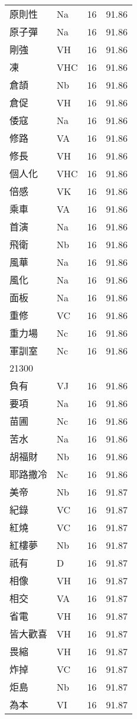 \documentclass[twocolumn]{book}
\begin{document}
\begin{supertabular}{llrr}
原則性 & Na & 16 &  91.86\\
原子彈 & Na & 16 &  91.86\\
剛強 & VH & 16 &  91.86\\
凍 & VHC & 16 &  91.86\\
倉頡 & Nb & 16 &  91.86\\
倉促 & VH & 16 &  91.86\\
倭寇 & Na & 16 &  91.86\\
修路 & VA & 16 &  91.86\\
修長 & VH & 16 &  91.86\\
個人化 & VHC & 16 &  91.86\\
倍感 & VK & 16 &  91.86\\
乘車 & VA & 16 &  91.86\\
首演 & Na & 16 &  91.86\\
飛衛 & Nb & 16 &  91.86\\
風華 & Na & 16 &  91.86\\
風化 & Na & 16 &  91.86\\
面板 & Na & 16 &  91.86\\
重修 & VC & 16 &  91.86\\
重力場 & Nc & 16 &  91.86\\
軍訓室 & Nc & 16 &  91.86\\
21300\\
負有 & VJ & 16 &  91.86\\
要項 & Na & 16 &  91.86\\
苗圃 & Nc & 16 &  91.86\\
苦水 & Na & 16 &  91.86\\
胡福財 & Nb & 16 &  91.86\\
耶路撒冷 & Nc & 16 &  91.86\\
美帝 & Nb & 16 &  91.87\\
紀錄 & VC & 16 &  91.87\\
紅燒 & VC & 16 &  91.87\\
紅樓夢 & Nb & 16 &  91.87\\
祇有 & D & 16 &  91.87\\
相像 & VH & 16 &  91.87\\
相交 & VA & 16 &  91.87\\
省電 & VH & 16 &  91.87\\
皆大歡喜 & VH & 16 &  91.87\\
畏縮 & VH & 16 &  91.87\\
炸掉 & VC & 16 &  91.87\\
炬島 & Nb & 16 &  91.87\\
為本 & VI & 16 &  91.87\\

\end{supertabular}
\end{document}
